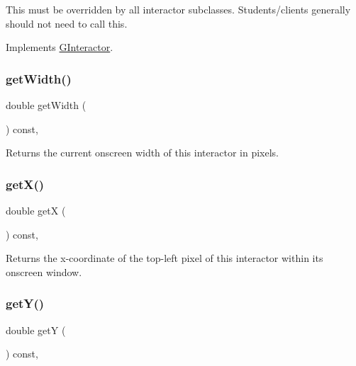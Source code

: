 This must be overridden by all interactor subclasses. Students/clients generally should not need to call this. 

Implements \mbox{\hyperlink{classsgl_1_1GInteractor}{G\+Interactor}}.

\mbox{\label{classsgl_1_1GInteractor_a0ed2965abd4f5701d2cadf71239faf19}} 
\subsubsection{\texorpdfstring{get\+Width()}{getWidth()}}
{\footnotesize\ttfamily double get\+Width (\begin{DoxyParamCaption}{ }\end{DoxyParamCaption}) const\hspace{0.3cm}{\ttfamily [virtual]}, {\ttfamily [inherited]}}



Returns the current onscreen width of this interactor in pixels. 

\mbox{\label{classsgl_1_1GInteractor_a344385751bee0720059403940d57a13e}} 
\subsubsection{\texorpdfstring{get\+X()}{getX()}}
{\footnotesize\ttfamily double getX (\begin{DoxyParamCaption}{ }\end{DoxyParamCaption}) const\hspace{0.3cm}{\ttfamily [virtual]}, {\ttfamily [inherited]}}



Returns the x-\/coordinate of the top-\/left pixel of this interactor within its onscreen window. 

\mbox{\label{classsgl_1_1GInteractor_aafa51c7f8f38a09febbb9ce7853f77b4}} 
\subsubsection{\texorpdfstring{get\+Y()}{getY()}}
{\footnotesize\ttfamily double getY (\begin{DoxyParamCaption}{ }\end{DoxyParamCaption}) const\hspace{0.3cm}{\ttfamily [virtual]}, {\ttfamily [inherited]}}



